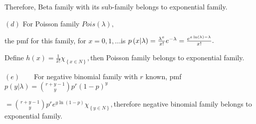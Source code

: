 \documentclass{article}
\begin{document}
Therefore, Beta family with its sub-family belongs to exponential family.

$\left( d\right) $ For Poisson family $Pois\left( \lambda \right) ,$

the pmf for this family, for $x=0,1,...$is $p\left( x|\lambda \right) =\frac{%
\lambda ^{x}}{x!}e^{-\lambda }=\frac{e^{x\ln \left( \lambda \right) -\lambda
}}{x!}.$

Define $h\left( x\right) =\frac{1}{x!}\chi _{\left\{ x\in N\right\} },$then
Poisson family belongs to exponential family.

$\left( e\right) \qquad $For negative binomial family with $r$ known, pmf $%
p\left( y|\lambda \right) =\binom{r+y-1}{y}p^{r}\left( 1-p\right) ^{y}$

$=\binom{r+y-1}{y}p^{r}e^{y\ln \left( 1-p\right) }\chi _{\left\{ y\in
N\right\} },$therefore negative binomial family belongs to exponential
family.

\bigskip
\end{document}
